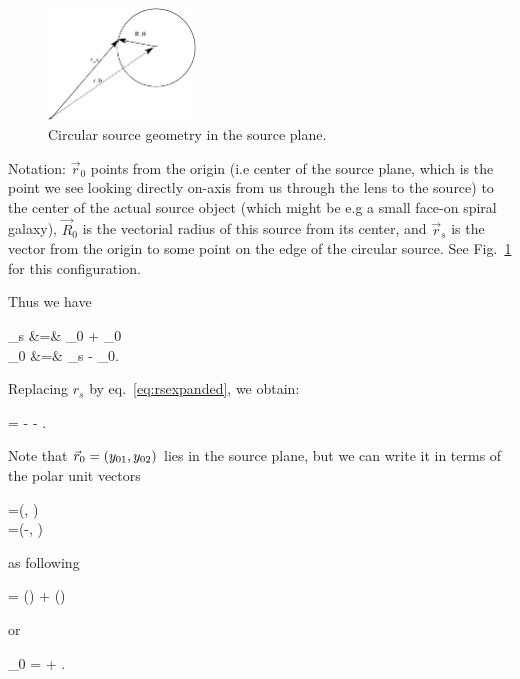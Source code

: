 \begin{figure}
  \begin{center}
   \includegraphics[width=0.35\textwidth]{graphics/sourceplane.pdf}
  \end{center}
    \caption{\label{fig:circular_source}Circular source geometry in the source
plane.}
\end{figure}

Notation: $ \vec{r}_{0}$ points from the origin (i.e center of the
source plane, which is the point we see looking directly on-axis from
us through the lens to the source) to the center of the actual source
object (which might be e.g a small face-on spiral galaxy), $
\vec{R}_{0}$ is the vectorial radius of this source from its center,
and $ \vec{r}_{s}$ is the vector from the origin to some point on the
edge of the circular source. See Fig.~\ref{fig:circular_source} for this
configuration.



Thus we have

\bea
{}_s &=&  _{0} + _{0} \\
  _{0} &=& _s - _{0}. \nonumber
\eea


Replacing $r_s$ by eq.~\eqref{eq:rsexpanded}, we obtain:

\beq
\label{eq:Rzero}
 =  - 
 \hat{\theta} - . \;\;\;
\eeq


Note that $\vec{r}_{0} = (y_{01},y_{02})$ lies in the source plane, but we
can write it in terms of the polar unit vectors

\bea
\label{eq:unitvs}
=(\cos\te, \sin \te) \\
\hat{\theta}=(-\sin \te, \cos \te)
\eea

 as following

\beq
\vecrz = (\vecrz \cdot \hatth) \hatth + (\vecrz \cdot \hatr) \hatr
\eeq

or


\beq
\label{eq:rzero}
_{0} = \left[ \yone \,  \cos \te + \ytwo \,  \sin \te \right]  +
\left[ -\yone \,  \sin \te + \ytwo \,  \cos \te \right] \hat{\theta}.  \;\;\;
\eeq

